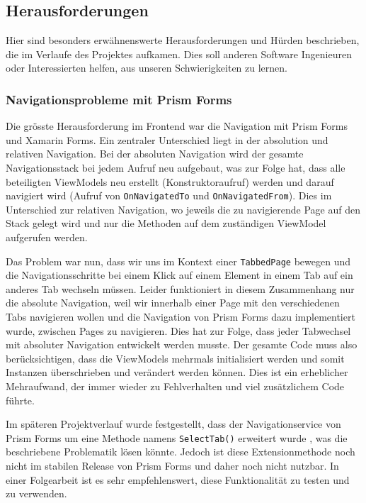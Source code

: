 \subsection{Herausforderungen}
\label{subsec:challenges}
Hier sind besonders erwähnenswerte Herausforderungen und Hürden beschrieben, die im Verlaufe des Projektes aufkamen. Dies soll anderen Software Ingenieuren oder Interessierten helfen, aus unseren Schwierigkeiten zu lernen. 


\subsubsection{Navigationsprobleme mit Prism Forms}\label{subsub:navigation}

Die grösste Herausforderung im Frontend war die Navigation mit Prism Forms und Xamarin Forms. Ein zentraler Unterschied liegt in der absolution und relativen Navigation. Bei der absoluten Navigation wird der gesamte Navigationsstack bei jedem Aufruf neu aufgebaut, was zur Folge hat, dass alle beteiligten ViewModels neu erstellt (Konstruktoraufruf) werden und darauf navigiert wird (Aufruf von \texttt{OnNavigatedTo} und \texttt{OnNavigatedFrom}). Dies im Unterschied zur relativen Navigation, wo jeweils die zu navigierende Page auf den Stack gelegt wird und nur die Methoden auf dem zuständigen ViewModel aufgerufen werden. 

Das Problem war nun, dass wir uns im Kontext einer \texttt{TabbedPage} bewegen und die Navigationsschritte bei einem Klick auf einem Element in einem Tab auf ein anderes Tab wechseln müssen. Leider funktioniert in diesem Zusammenhang nur die absolute Navigation, weil wir innerhalb einer Page mit den verschiedenen Tabs navigieren wollen und die Navigation von Prism Forms dazu implementiert wurde, zwischen Pages zu navigieren. Dies hat zur Folge, dass jeder Tabwechsel mit absoluter Navigation entwickelt werden musste. Der gesamte Code muss also berücksichtigen, dass die ViewModels mehrmals initialisiert werden und somit Instanzen überschrieben und verändert werden können. Dies ist ein erheblicher Mehraufwand, der immer wieder zu Fehlverhalten und viel zusätzlichem Code führte. 

Im späteren Projektverlauf wurde festgestellt, dass der Navigationservice von Prism Forms um eine Methode namens \texttt{SelectTab()} erweitert wurde \cite{prism-selecttab}, was die beschriebene Problematik lösen könnte. Jedoch ist diese Extensionmethode noch nicht im stabilen Release von Prism Forms und daher noch nicht nutzbar. In einer Folgearbeit ist es sehr empfehlenswert, diese Funktionalität zu testen und zu verwenden. 

